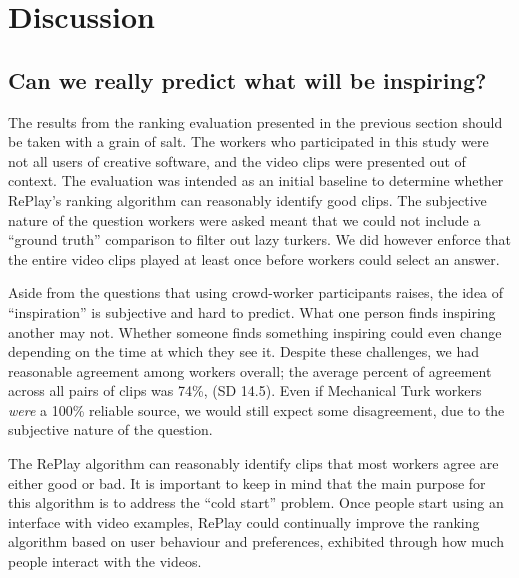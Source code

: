 \section{Discussion}

\subsection{Can we really predict what will be inspiring?}
The results from the ranking evaluation presented in the previous section should be taken with a grain of salt. The workers who participated in this study were not all users of creative software, and the video clips were presented out of context. The evaluation was intended as an initial baseline to determine whether RePlay's ranking algorithm can reasonably identify good clips. The subjective nature of the question workers were asked meant that we could not include a ``ground truth'' comparison to filter out lazy turkers. We did however enforce that the entire video clips played at least once before workers could select an answer.

Aside from the questions that using crowd-worker participants raises, the idea of ``inspiration'' is subjective and hard to predict. What one person finds inspiring another may not. Whether someone finds something inspiring could even change depending on the time at which they see it. Despite these challenges, we had reasonable agreement among workers overall; the average percent of agreement across all pairs of clips was 74\%, (SD 14.5). Even if Mechanical Turk workers \textit{were} a 100\% reliable source, we would still expect some disagreement, due to the subjective nature of the question.

The RePlay algorithm can reasonably identify clips that most workers agree are either good or bad. It is important to keep in mind that the main purpose for this algorithm is to address the ``cold start'' problem. Once people start using an interface with video examples, RePlay could continually improve the ranking algorithm based on user behaviour and preferences, exhibited through how much people interact with the videos. %

